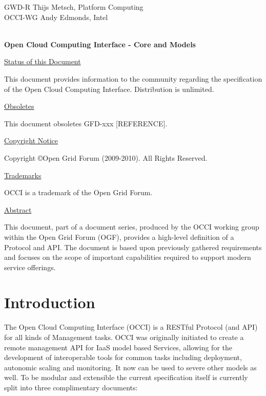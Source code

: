 \documentclass[10pt,a4paper]{article}
\begin{document}
\thispagestyle{empty}

GWD-R \hfill  Thijs Metsch, Platform Computing\\
OCCI-WG \hfill  Andy Edmonds, Intel\\
\\

\vspace*{0.5in}

\begin{Large}
\textbf{Open Cloud Computing Interface - Core and Models}
\end{Large}

\vspace*{0.5in}

\underline{Status of this Document}

This document provides information to the community regarding the specification of the Open Cloud Computing Interface. Distribution is unlimited.

\underline{Obsoletes}

This document obsoletes GFD-xxx [REFERENCE].

\underline{Copyright Notice}

Copyright \copyright Open Grid Forum (2009-2010). All Rights Reserved.

\underline{Trademarks}

OCCI is a trademark of the Open Grid Forum.

\underline{Abstract}

This document, part of a document series, produced by the OCCI working group within the Open Grid Forum (OGF), provides a high-level definition of a Protocol and API. The document is based upon previously gathered requirements and focuses on the scope of important capabilities required to support modern service offerings. 

\newpage
\tableofcontents
\newpage

\section{Introduction}
The Open Cloud Computing Interface (OCCI) is a RESTful Protocol (and API)  for all kinds of Management tasks. OCCI was originally initiated to create a remote management API for IaaS model based Services, allowing for the development of interoperable tools for common tasks including deployment, autonomic scaling and monitoring. It now can be used to severe other models as well. To be modular and extensible the current specification itself is currently split into three complimentary documents:
\end{document}
